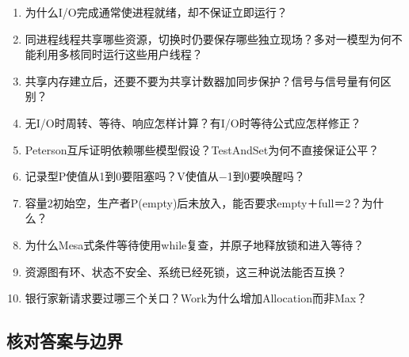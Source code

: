 \begin{recallcard}[从执行身份回忆到资源安全]

\begin{enumerate}
\def\labelenumi{\arabic{enumi}.}
\tightlist
\item
  为什么I/O完成通常使进程就绪，却不保证立即运行？
\item
  同进程线程共享哪些资源，切换时仍要保存哪些独立现场？多对一模型为何不能利用多核同时运行这些用户线程？
\item
  共享内存建立后，还要不要为共享计数器加同步保护？信号与信号量有何区别？
\item
  无I/O时周转、等待、响应怎样计算？有I/O时等待公式应怎样修正？
\item
  Peterson互斥证明依赖哪些模型假设？TestAndSet为何不直接保证公平？
\item
  记录型P使值从1到0要阻塞吗？V使值从\ensuremath{-}1到0要唤醒吗？
\item
  容量2初始空，生产者P(empty)后未放入，能否要求empty＋full＝2？为什么？
\item
  为什么Mesa式条件等待使用while复查，并原子地释放锁和进入等待？
\item
  资源图有环、状态不安全、系统已经死锁，这三种说法能否互换？
\item
  银行家新请求要过哪三个关口？Work为什么增加Allocation而非Max？
\end{enumerate}

\end{recallcard}

\subsection{核对答案与边界}\label{OS02-recall-answers}

